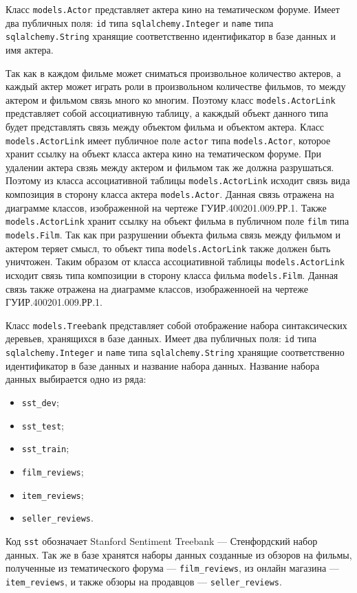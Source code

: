 Класс \texttt{models.Actor} представляет актера кино на тематическом форуме. Имеет два публичных поля: \texttt{id} типа \texttt{sqlalchemy.Integer} и \texttt{name} типа \texttt{sqlalchemy.String} хранящие соответственно идентификатор в базе данных и имя актера.

Так как в каждом фильме может сниматься произвольное количество актеров, а каждый актер может играть роли в произвольном количестве фильмов, то между актером и фильмом связь много ко многим. Поэтому класс \texttt{models.ActorLink} представляет собой ассоциативную таблицу, а какждый объект данного типа будет представлять связь между объектом фильма и объектом актера. Класс \texttt{models.ActorLink} имеет публичное поле \texttt{actor} типа \texttt{models.Actor}, которое хранит ссылку на объект класса актера кино на тематическом форуме. При удалении актера свзяь между актером и фильмом так же должна разрушаться. Поэтому из класса ассоциативной таблицы \texttt{models.ActorLink} исходит связь вида композиция в сторону класса актера \texttt{models.Actor}. Данная связь отражена на диаграмме классов, изображенной на чертеже ГУИР.400201.009.РР.1. Также \texttt{models.ActorLink} хранит ссылку на объект фильма в публичном поле \texttt{film} типа \texttt{models.Film}. Так как при разрушении объекта фильма связь между фильмом и актером теряет смысл, то объект типа \texttt{models.ActorLink} также должен быть уничтожен. Таким образом от класса ассоциативной таблицы \texttt{models.ActorLink} исходит связь типа композиции в сторону класса фильма \texttt{models.Film}. Данная связь также отражена на диаграмме классов, изображенноей на чертеже ГУИР.400201.009.РР.1.

Класс \texttt{models.Treebank} представляет собой отображение набора синтаксических деревьев, хранящихся в базе данных. Имеет два публичных поля: \texttt{id} типа \texttt{sqlalchemy.Integer} и \texttt{name} типа \texttt{sqlalchemy.String} хранящие соответственно идентификатор в базе данных и название набора данных. Название набора данных выбирается одно из ряда:
\begin{itemize}
\item \texttt{sst\_dev};
\item \texttt{sst\_test};
\item \texttt{sst\_train};
\item \texttt{film\_reviews};
\item \texttt{item\_reviews};
\item \texttt{seller\_reviews}.
\end{itemize}
Код \texttt{sst} обозначает Stanford Sentiment Treebank --- Стенфордский набор данных. Так же в базе хранятся наборы данных созданные из обзоров на фильмы, полученные из тематического форума --- \texttt{film\_reviews}, из онлайн магазина --- \texttt{item\_reviews}, и также обзоры на продавцов --- \texttt{seller\_reviews}.

